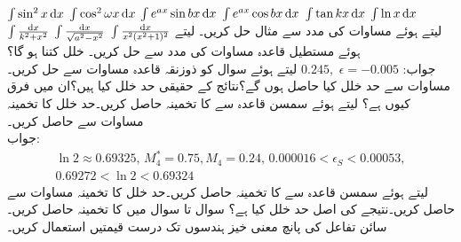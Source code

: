 \quad 
$\int \sin^2 x\dif x$
\quad 
$\int \cos^2 \omega x\dif x$
\quad 
$\int e^{ax}\sin bx\dif x$
\quad 
$\int e^{ax}\cos bx\dif x$
\quad 
$\int \tan kx\dif x$
\quad 
$\int \ln x\dif x$
\quad 
$\int \frac{\dif x}{k^2+x^2}$
\quad 
$\int \frac{\dif x}{\sqrt{a^2-x^2}}$
\quad 
$\int \frac{\dif x}{x^2(x^2+1)^2}$
\quad
{} لیتے ہوئے مساوات  کی مدد سے مثال  حل کریں۔
\quad
{} لیتے ہوئے مستطیل قاعدہ مساوات کی مدد سے  حل کریں۔ خلل کتنا ہو گا؟\\
جواب:\quad
$0.245,\,\,\epsilon=-0.005$
\quad
{} لیتے ہوئے سوال  کو ذوزنقہ قاعدہ مساوات  سے حل کریں۔مساوات  سے حد خلل کیا حاصل ہوں گے؟نتائج کے حقیقی حد خلل کیا ہیں؟ان میں فرق کیوں ہے؟
\quad
{} لیتے ہوئے سمسن قاعدہ سے  کا تخمینہ حاصل کریں۔حد خلل کا تخمینہ مساوات  سے حاصل کریں۔\\
جواب:\quad
\begin{align*}
\ln 2\approx \num{0.69325},\,M_4^*=0.75, M_4=0.24,\, \num{0.000016}<\epsilon_S<\num{0.00053}, \\
\num{0.69272}<\ln 2<\num{0.69324}
\end{align*}
\quad
{} لیتے ہوئے سمسن قاعدہ سے  کا تخمینہ حاصل کریں۔حد خلل کا تخمینہ مساوات  سے حاصل کریں۔نتیجے کی اصل حد خلل کیا ہے؟
سوال  تا سوال  میں  کا تخمینہ حاصل کریں۔ سائن تفاعل کی پانچ معنی خیز ہندسوں تک درست قیمتیں استعمال کریں۔

